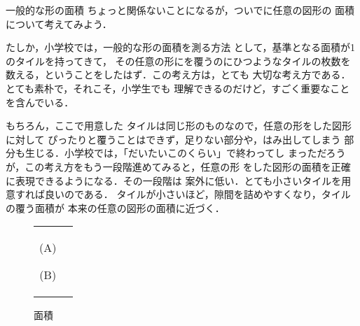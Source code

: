             \begin{memo}{一般的な形の面積}
                ちょっと関係ないことになるが，ついでに任意の図形の
                面積について考えてみよう．

                たしか，小学校では，一般的な形の面積を測る方法
                として，基準となる面積が1のタイルを持ってきて，
                その任意の形にを覆うのにひつようなタイルの枚数を
                数える，ということをしたはず．この考え方は，とても
                大切な考え方である．とても素朴で，それこそ，小学生でも
                理解できるのだけど，すごく重要なことを含んでいる．

                もちろん，ここで用意した
                タイルは同じ形のものなので，任意の形をした図形に対して
                ぴったりと覆うことはできず，足りない部分や，はみ出してしまう
                部分も生じる．小学校では，「だいたいこのくらい」で終わってし
                まっただろうが，この考え方をもう一段階進めてみると，任意の形
                をした図形の面積を正確に表現できるようになる．その一段階は
                案外に低い．とても小さいタイルを用意すれば良いのである．
                タイルが小さいほど，隙間を詰めやすくなり，タイルの覆う面積が
                本来の任意の図形の面積に近づく．
                \begin{figure}[hbt]
                    \begin{tabular}{cc}
                        \begin{minipage}{0.5\hsize}
                            \begin{center}
                                {MensekiToZahyou.pdf}

                                (A)
                            \end{center}
                        \end{minipage}
                        \begin{minipage}{0.5\hsize}
                            \begin{center}
                                {MensekiToZahyou_dtl.pdf}

                                (B)
                            \end{center}
                        \end{minipage}
                    \end{tabular}
                    \caption{面積}
                \end{figure}



\end{memo}
